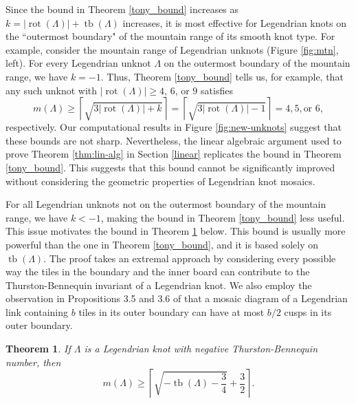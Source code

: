 \documentclass{article}
\DeclareMathOperator{\tb}{tb}
\DeclareMathOperator{\rot}{rot}
\newtheorem{theorem}{Theorem}
\begin{document}
Since the bound in Theorem \ref{tony_bound} increases as $k=|\rot(\Lambda)|+\tb(\Lambda)$ increases, it is most effective for Legendrian knots on the ``outermost boundary" of the mountain range of its smooth knot type. For example, consider the mountain range of Legendrian unknots (Figure \ref{fig:mtn}, left). For every Legendrian unknot $\Lambda$ on the outermost boundary of the mountain range, we have $k=-1$. Thus, Theorem \ref{tony_bound} tells us, for example, that any such unknot with $|\rot(\Lambda)|\geq 4$, $6$, or $9$ satisfies
\[m(\Lambda) \geq \left\lceil \sqrt{3|\rot(\Lambda)|+k} \right\rceil = \left\lceil \sqrt{3|\rot(\Lambda)|-1} \right\rceil = 4, 5, \text{or } 6,\] 
respectively. Our computational results in Figure \ref{fig:new-unknots} suggest that these bounds are not sharp. 
Nevertheless, the linear algebraic argument used to prove Theorem \ref{thm:lin-alg} in Section \ref{linear} replicates the bound in Theorem \ref{tony_bound}. This suggests that this bound cannot be significantly improved without considering the geometric properties of Legendrian knot mosaics.

For all Legendrian unknots not on the outermost boundary of the mountain range, we have $k<-1$, making the bound in Theorem \ref{tony_bound} less useful.
This issue motivates the bound in Theorem \ref{sqrtbound} below. This bound is usually more powerful than the one in Theorem \ref{tony_bound}, and it is based solely on $\tb(\Lambda)$.
The proof takes an extremal approach by considering every possible way the tiles in the boundary and the inner board can contribute to the Thurston-Bennequin invariant of a Legendrian knot. We also employ the observation in Propositions 3.5 and 3.6 of \cite{pezzimenti} that a mosaic diagram of a Legendrian link containing $b$ tiles in its outer boundary can have at most $b/2$ cusps in its outer boundary.

\begin{theorem}\label{sqrtbound}
    If $\Lambda$ is a Legendrian knot with negative Thurston-Bennequin number, then
    \[
    m(\Lambda)\geq \left\lceil \sqrt{-\operatorname{tb}(\Lambda)-\frac{3}{4}} + \frac{3}{2} \right\rceil.
    \]
\end{theorem}
\end{document}

